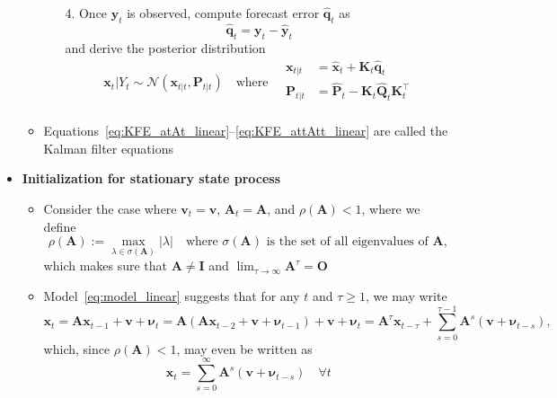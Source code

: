 \documentclass[12pt,a4paper]{article}
\begin{document}
\begin{itemize}
\begin{itemize}
\begin{itemize}
    \item[4.] Once $\bm{y}_{t}$ is observed,
      compute forecast error $\hat{\bm{q}}_{t}$ as
      \begin{equation}\label{eq:KFE_et_linear}%
        \hat{\bm{q}}_{t} = \bm{y}_{t} - \hat{\bm{y}}_{t}
      \end{equation}
      and derive the posterior distribution
      \begin{equation}\label{eq:KFE_attAtt_linear}%
        \bm{x}_{t}|Y_{t}\sim \mathcal{N}(\bm{x}_{t|t},\bm{P}_{t|t})
        \quad\text{where}\quad
        \begin{aligned}
          \bm{x}_{t|t} & = \hat{\bm{x}}_{t} + \bm{K}_{t}\hat{\bm{q}}_{t} \\
          \bm{P}_{t|t} & = \hat{\bm{P}}_{t} - \bm{K}_{t}\hat{\bm{Q}}_{t}\bm{K}_{t}^{\top} \\
        \end{aligned}
      \end{equation}

    \end{itemize}

  \item
    Equations~\eqref{eq:KFE_atAt_linear}--\eqref{eq:KFE_attAtt_linear}
    are called the Kalman filter equations

  \end{itemize}

  \clearpage
\item \textbf{Initialization for stationary state process}

  \begin{itemize}

  \item Consider the case where $\bm{v}_{t}=\bm{v}$, $\bm{A}_{t}=\bm{A}$, and $\rho(\bm{A})<1$, where
    we define
    \begin{equation}\nonumber%
      \rho(\bm{A}) := \max_{\lambda \in \sigma(\bm{A})}|\lambda|
      \quad\text{where $\sigma(\bm{A})$ is the set of all eigenvalues of $\bm{A}$},
    \end{equation}
    which makes sure that $\bm{A}\neq \bm{I}$ and
    $\lim_{\tau\to\infty}\bm{A}^{\tau} = \bm{O}$

  \item Model~\eqref{eq:model_linear} suggests that for any $t$ and
    $\tau\geq 1$, we may write
    \begin{equation}
      \bm{x}_{t}
      = \bm{A}\bm{x}_{t-1} + \bm{v} + \bm{\nu}_{t}
      = \bm{A}(\bm{A}\bm{x}_{t-2} + \bm{v} + \bm{\nu}_{t-1}) + \bm{v} +\bm{\nu}_{t}
      = \bm{A}^{\tau}\bm{x}_{t-\tau} + \sum_{s=0}^{\tau-1}\bm{A}^{s}(\bm{v}+\bm{\nu}_{t-s}),
      \nonumber%
    \end{equation}
    which, since $\rho(\bm{A})<1$, may even be written as
    \begin{equation}\label{eq:alphat_stationary_linear}%
      \bm{x}_{t} = \sum_{s=0}^{\infty}\bm{A}^{s}(\bm{v}+\bm{\nu}_{t-s}) \quad \forall t
    \end{equation}


\end{itemize}
\end{itemize}
\end{document}
